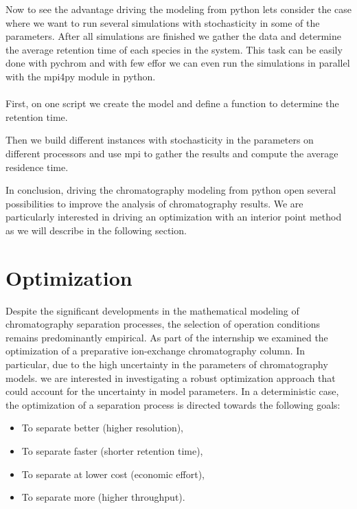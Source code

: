 \documentclass[paper=a4, fontsize=11pt]{scrartcl}
\begin{document}
Now to see the advantage driving the modeling from python lets consider the case where we want to run several simulations with stochasticity in some of the parameters. After all simulations are finished we gather the data and determine the average retention time of each species in the system. This task can be easily done with pychrom and with few effor we can even run the simulations in parallel with the mpi4py module in python. 
\\
\\
First, on one script we create the model and define a function to determine the retention time.



Then we build different instances with stochasticity in the parameters on different processors and use mpi to gather the results and compute the average residence time.



In conclusion, driving the chromatography modeling from python open several possibilities to improve the analysis of chromatography results. We are particularly interested in driving an optimization with an interior point method as we will describe in the following section.

\section{Optimization}

Despite the significant developments in the mathematical modeling of chromatography separation processes, the selection of operation conditions remains predominantly empirical. As part of the internship we examined the optimization of a preparative ion-exchange chromatography column. In particular, due to the high uncertainty in the parameters of chromatography models. we are interested in investigating a robust optimization approach that could account for the uncertainty in model parameters.  In a deterministic case, the optimization of a separation process is directed towards the following goals:

\begin{itemize}
\item To separate better (higher resolution),
\item To separate faster (shorter retention time),
\item To separate at lower cost (economic effort),
\item To separate more (higher throughput).
\end{itemize}
\end{document}
